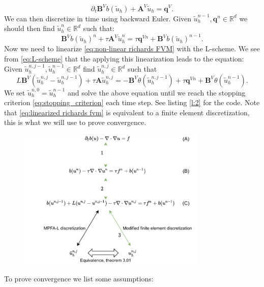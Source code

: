 \documentclass[../Main/main.tex]{subfiles}
\begin{document}
	\begin{equation}
		\partial_t\pmb{B}^{V} b(\tilde{u}_h) + \pmb{A}^V \tilde{u}_h = \pmb{q}^V. 
	\end{equation}
	We can then discretize in time using backward Euler. Given $ \tilde{u}_h^{n-1},\pmb{q}^n \in \mathbb{R}^d$ we should then find $ \tilde{u}_h^n \in \mathbb{R}^d$ such that: 
	\begin{equation} \label{eq:non-linear richards FVM}
		\pmb{B}^V  b(\tilde{u}_h)^n + \tau \pmb{A}^V \tilde{u}_h^n = \tau \pmb{q}^{Vn} + \pmb{B}^V  b(\tilde{u}_h)^{n-1}.
	\end{equation}
	Now we need to linearize \eqref{eq:non-linear richards FVM} with the L-scheme. We see from \eqref{eq:L-scheme} that the applying this linearization leads to the equation: Given $\tilde{u}^{n,j-1}_h, \tilde{u}^{n-1}_h \in \mathbb{R}^d$ find $\tilde{u}^{n,j}_h \in \mathbb{R}^d$ such that
	\begin{equation}\label{eq:linearized richards fvm}
		L\pmb{B}^V(\tilde{u}^{n,j}_h-\tilde{u}^{n,j-1}_h) + \tau \pmb{A} \tilde{u}_h^{n,j} = -\pmb{B}^V \theta (\tilde{u}_h^{n,j-1})  + \tau \pmb{q}^{Vn} +  \pmb{B}^V \theta (\tilde{u}_h^{n-1}).
	\end{equation}
	We set $\tilde{u}^{n,0}_h=\tilde{u}^{n-1}_h$ and solve the above equation until we reach the stopping criterion \eqref{eq:stopping_criterion} each time step. See listing \ref{l:2} for the code. Note that \eqref{eq:linearized richards fvm} is equivalent to a finite element discretization, this is what we will use to prove convergence. 
	\begin{figure}[H]
		\centering
		\includegraphics[width=0.8\textwidth]{convergence schema.pdf}
		\caption{}
		\label{fig:convergence schema}
	\end{figure}
	To prove convergence we list some assumptions:
\end{document}
